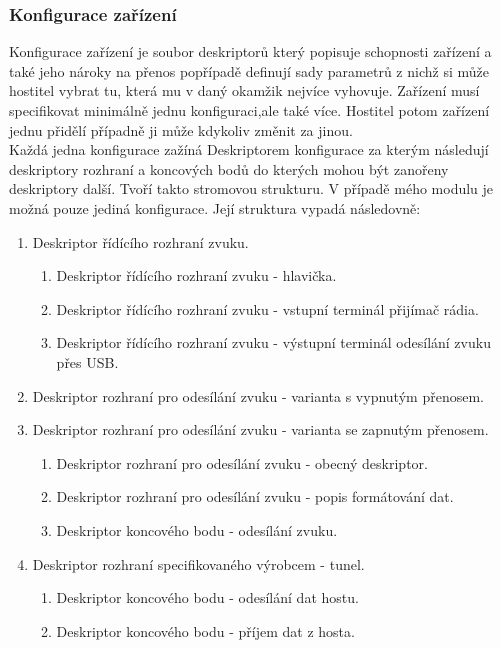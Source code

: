 \subsubsection{Konfigurace zařízení}
Konfigurace zařízení je soubor deskriptorů který popisuje schopnosti zařízení a také jeho nároky na přenos popřípadě definují sady parametrů z nichž si může hostitel vybrat tu, která mu v daný okamžik nejvíce vyhovuje. Zařízení musí specifikovat minimálně jednu konfiguraci,ale také více. Hostitel potom zařízení jednu přidělí případně ji může kdykoliv změnit za jinou.\\
Každá jedna konfigurace zažíná Deskriptorem konfigurace za kterým následují deskriptory rozhraní a koncových bodů do kterých mohou být zanořeny deskriptory další. Tvoří takto stromovou strukturu. V případě mého modulu je možná pouze jediná konfigurace. Její struktura vypadá následovně:
\FloatBarrier
\begin{enumerate}
\item Deskriptor řídícího rozhraní zvuku.
	\begin{enumerate}
	\item Deskriptor řídícího rozhraní zvuku - hlavička.
	\item Deskriptor řídícího rozhraní zvuku - vstupní terminál přijímač rádia.
	\item Deskriptor řídícího rozhraní zvuku - výstupní terminál odesílání zvuku přes USB.
	\end{enumerate}
\item Deskriptor rozhraní pro odesílání zvuku - varianta s vypnutým přenosem.
\item Deskriptor rozhraní pro odesílání zvuku - varianta se zapnutým přenosem.
	\begin{enumerate}
	\item Deskriptor rozhraní pro odesílání zvuku - obecný deskriptor.
	\item Deskriptor rozhraní pro odesílání zvuku - popis formátování dat.
	\item Deskriptor koncového bodu - odesílání zvuku.
	\end{enumerate}
\item Deskriptor rozhraní specifikovaného výrobcem - \iic tunel.
	\begin{enumerate}
	\item Deskriptor koncového bodu - odesílání dat hostu.
	\item Deskriptor koncového bodu - příjem dat z hosta.
	\end{enumerate}
\end{enumerate}
\FloatBarrier


